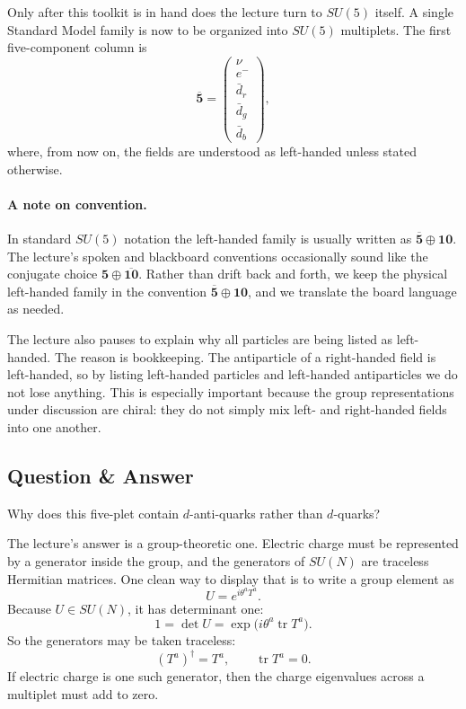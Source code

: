 Only after this toolkit is in hand does the lecture turn to \(SU(5)\) itself. A single Standard Model family is now to be organized into \(SU(5)\) multiplets. The first five-component column is
\begin{equation}
\overline{\mathbf 5}
=
\begin{pmatrix}
\nu\\
e^-\\
\bar d_r\\
\bar d_g\\
\bar d_b
\end{pmatrix},
\end{equation}
where, from now on, the fields are understood as left-handed unless stated otherwise.

\paragraph{A note on convention.}
In standard \(SU(5)\) notation the left-handed family is usually written as \(\overline{\mathbf 5}\oplus \mathbf{10}\). The lecture's spoken and blackboard conventions occasionally sound like the conjugate choice \(\mathbf 5\oplus \overline{\mathbf{10}}\). Rather than drift back and forth, we keep the physical left-handed family in the convention \(\overline{\mathbf 5}\oplus \mathbf{10}\), and we translate the board language as needed.

The lecture also pauses to explain why all particles are being listed as left-handed. The reason is bookkeeping. The antiparticle of a right-handed field is left-handed, so by listing left-handed particles and left-handed antiparticles we do not lose anything. This is especially important because the group representations under discussion are chiral: they do not simply mix left- and right-handed fields into one another.

\subsection{Question \& Answer}

Why does this five-plet contain \(d\)-anti-quarks rather than \(d\)-quarks?

The lecture's answer is a group-theoretic one. Electric charge must be represented by a generator inside the group, and the generators of \(SU(N)\) are traceless Hermitian matrices. One clean way to display that is to write a group element as
\begin{equation}
U=e^{i\theta^a T^a}.
\end{equation}
Because \(U\in SU(N)\), it has determinant one:
\begin{equation}
1=\det U = \exp\!\bigl(i\theta^a \operatorname{tr}T^a\bigr).
\end{equation}
So the generators may be taken traceless:
\begin{equation}
(T^a)^\dagger=T^a,\qquad \operatorname{tr}T^a=0.
\end{equation}
If electric charge is one such generator, then the charge eigenvalues across a multiplet must add to zero.

